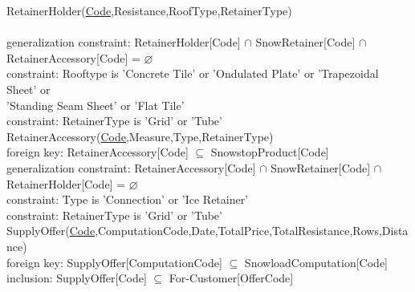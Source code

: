 {\color{ForestGreen}RetainerHolder(\underline{Code},Resistance,RoofType,RetainerType)}\\
{ \\
{\color{Orange}\hspace{2mm} generalization constraint: {\color{Magenta} RetainerHolder[Code] $\cap $ SnowRetainer[Code] $\cap$ RetainerAccessory[Code] = $\varnothing $}} \\
{\color{Orange}\hspace{2mm} constraint: {\color{Magenta}Rooftype is 'Concrete Tile' or 'Ondulated Plate' or 'Trapezoidal Sheet' or}} \\
{\color{Magenta}\hspace{19.5mm}'Standing Seam Sheet' or 'Flat Tile'}\\
{\color{Orange}\hspace{2mm} constraint: {\color{Magenta}RetainerType is 'Grid' or 'Tube'}} \\

{\color{ForestGreen}RetainerAccessory(\underline{Code},Measure,Type,RetainerType)}\\
{\color{Orange}\hspace{2mm} foreign key: {\color{Magenta}RetainerAccessory[Code] $\subseteq$ SnowstopProduct[Code]}} \\
{\color{Orange}\hspace{2mm} generalization constraint: {\color{Magenta} RetainerAccessory[Code] $\cap $ SnowRetainer[Code] $\cap$ RetainerHolder[Code] = $\varnothing $}} \\
{\color{Orange}\hspace{2mm} constraint: {\color{Magenta}Type is 'Connection' or 'Ice Retainer'}} \\
{\color{Orange}\hspace{2mm} constraint: {\color{Magenta}RetainerType is 'Grid' or 'Tube'}} \\

{\color{ForestGreen}SupplyOffer(\underline{Code},ComputationCode,Date,TotalPrice,TotalResistance,Rows,Distance)}\\
{\color{Orange}\hspace{2mm} foreign key: {\color{Magenta}SupplyOffer[ComputationCode] $\subseteq$ SnowloadComputation[Code]}} \\
{\color{Orange}\hspace{2mm} inclusion: {\color{Magenta}SupplyOffer[Code] $\subseteq$ For-Customer[OfferCode]}} \\

}

